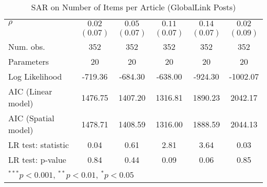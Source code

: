 \begin{table}[!h]
\begin{center}
\begin{tabular}{l c c c c c }
$\rho$                  & $0.02$       & $0.05$       & $0.11$       & $0.14$       & $0.02$       \\
                        & $(0.07)$     & $(0.07)$     & $(0.07)$     & $(0.07)$     & $(0.09)$     \\
\midrule
Num. obs.               & 352          & 352          & 352          & 352          & 352          \\
Parameters              & 20           & 20           & 20           & 20           & 20           \\
Log Likelihood          & -719.36      & -684.30      & -638.00      & -924.30      & -1002.07     \\
AIC (Linear model)      & 1476.75      & 1407.20      & 1316.81      & 1890.23      & 2042.17      \\
AIC (Spatial model)     & 1478.71      & 1408.59      & 1316.00      & 1888.59      & 2044.13      \\
LR test: statistic      & 0.04         & 0.61         & 2.81         & 3.64         & 0.03         \\
LR test: p-value        & 0.84         & 0.44         & 0.09         & 0.06         & 0.85         \\
\bottomrule
\multicolumn{6}{l}{\scriptsize{$^{***}p<0.001$, $^{**}p<0.01$, $^*p<0.05$}}
\end{tabular}
\caption{SAR on Number of Items per Article (GlobalLink Posts)}
\label{table:coefficients}
\end{center}
\end{table}
